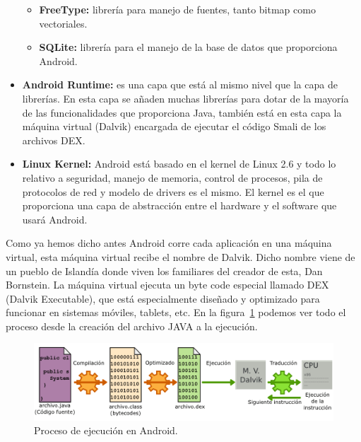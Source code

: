 \begin{itemize}
\begin{itemize}
	\item \textbf{FreeType:} librería para manejo de fuentes, tanto bitmap como vectoriales.

	\item \textbf{SQLite:} librería para el manejo de la base de datos que proporciona Android.

\end{itemize}

\item \textbf{Android Runtime:} es una capa que está al mismo nivel que la capa de librerías. En esta capa se añaden muchas librerías para dotar de la mayoría de las funcionalidades que proporciona Java, también está en esta capa la máquina virtual (Dalvik) encargada de ejecutar el código Smali de los archivos DEX.

\item \textbf{Linux Kernel:} Android está basado en el kernel de Linux 2.6 y todo lo relativo a seguridad, manejo de memoria, control de procesos, pila de protocolos de red y modelo de drivers es el mismo. El kernel es el que proporciona una capa de abstracción entre el hardware y el software que usará Android.

\end{itemize}

Como ya hemos dicho antes Android corre cada aplicación en una máquina virtual, esta máquina virtual recibe el nombre de Dalvik. Dicho nombre viene de un pueblo de Islandía donde viven los familiares del creador de esta, Dan Bornstein. La máquina virtual ejecuta un byte code especial llamado DEX (Dalvik Executable), que está especialmente diseñado y optimizado para funcionar en sistemas móviles, tablets, etc. En la figura~\ref{fig:maquinaVirtualDalvik} podemos ver todo el proceso desde la creación del archivo JAVA a la ejecución.

\begin{figure}[h]
  \centering
    \includegraphics[scale=0.8]{./Android/imagenes/maquinaVirtualDalvik.png}
  \caption{Proceso de ejecución en Android.}
  \label{fig:maquinaVirtualDalvik}
\end{figure}


